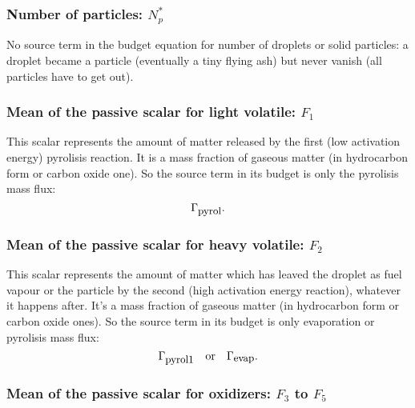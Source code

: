 \subsubsection{Number of particles: $N_{p}^{*}$}
No source term in the budget equation for number of droplets or solid particles: a droplet became a particle (eventually a tiny flying ash) but never vanish
(all particles have to get out).


\subsubsection{Mean of the passive scalar for light volatile: $F_{1}$}

This scalar represents the amount of matter released by the first (low
activation energy) pyrolisis reaction. It is a mass fraction of gaseous matter
(in hydrocarbon form or carbon oxide one). So the source term in its budget is
only the pyrolisis mass flux:
\begin{equation}
    \Gamma _{\mbox{\small pyrol}}.
\end{equation}
\subsubsection{Mean of the passive scalar for heavy volatile: $F_{2}$}

This scalar represents the amount of matter which has leaved the droplet as fuel
vapour or the particle by the second (high activation energy reaction), whatever
it happens after. It's a mass fraction of gaseous matter (in hydrocarbon form or
carbon oxide ones). So the source term in its budget is only evaporation or
pyrolisis mass flux:
\begin{equation}
    \Gamma_{\mbox{\small pyrol1}} \quad \text{or} \quad \Gamma_{\mbox{\small evap}}.
\end{equation}

\subsubsection{Mean of the passive scalar for oxidizers: $F_{3}$ to $F_{5}$}

